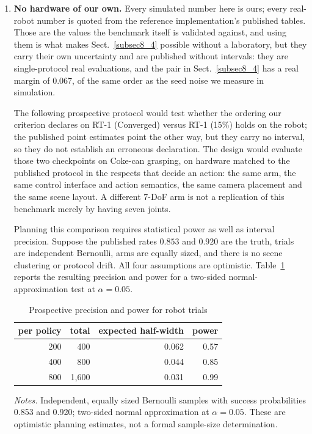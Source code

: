 \documentclass[pdflatex,iicol,sn-apa]{sn-jnl}
\theoremstyle{remark}
\newcommand{\tablenote}[1]{\par\vspace{4pt}\noindent
\begin{minipage}{\linewidth}\tablefootnotefont\raggedright #1\par\end{minipage}}
\begin{document}
\begin{enumerate}
\item \textbf{No hardware of our own.} Every simulated number here is ours; every real-robot number
is quoted from the reference implementation's published tables. Those are the values the benchmark
itself is validated against, and using them is what makes Sect.~\ref{subsec8_4} possible without a
laboratory, but they carry their own uncertainty and are published without intervals: they are
single-protocol real
evaluations, and the pair in Sect.~\ref{subsec8_4} has a real margin of 0.067, of the same order as
the seed noise we measure in simulation.

The following prospective protocol would test whether the ordering our
criterion declares on RT-1 (Converged) versus RT-1 (15\%) holds on the robot; the
published point estimates point the other way, but they carry no interval, so they do not establish
an erroneous declaration. The design would evaluate those two checkpoints on
Coke-can grasping, on hardware matched to the published protocol in the respects that decide an action:
the same arm, the same control interface and action semantics, the same camera placement and the
same scene layout. A different 7-DoF arm is not a replication of this benchmark merely by
having seven joints.

Planning this comparison requires statistical power as well as interval precision. Suppose the
published rates $0.853$ and $0.920$ are the truth, trials are independent Bernoulli, arms are
equally sized, and there is no scene clustering or protocol drift. All four assumptions are
optimistic. Table~\ref{tab:power} reports the resulting precision and power for a two-sided
normal-approximation test at $\alpha = 0.05$.

\begin{table}[h]
\caption{Prospective precision and power for robot trials}\label{tab:power}
\centering
\begin{tabular}{@{}rrrr@{}}
\toprule
per policy & total & expected half-width & power \\
\midrule
200 & 400 & 0.062 & 0.57 \\
400 & 800 & 0.044 & 0.85 \\
800 & 1{,}600 & 0.031 & 0.99 \\
\bottomrule
\end{tabular}
\tablenote{\textit{Notes.} Independent, equally sized Bernoulli samples with success probabilities 0.853 and 0.920; two-sided normal approximation at $\alpha=0.05$. These are optimistic planning estimates, not a formal sample-size determination.}
\end{table}


\end{enumerate}
\end{document}
